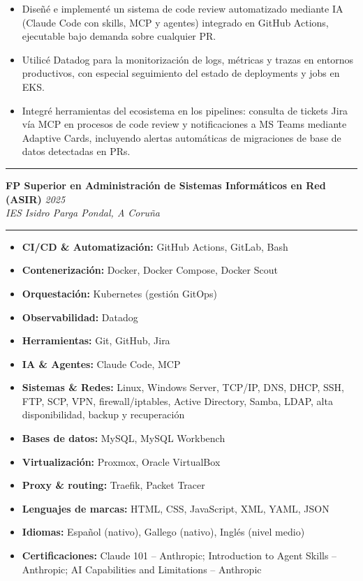 \documentclass[a4paper,11pt]{article}
\newcommand{\cvsection}[1]{%
  \vspace{10pt}%
  \noindent{\large\bfseries\MakeUppercase{#1}}%
  \vspace{2pt}\par\noindent\rule{\linewidth}{0.4pt}%
  \vspace{6pt}%
}
\begin{document}
\begin{itemize}
  \item Diseñé e implementé un sistema de code review automatizado mediante IA (Claude Code con skills, MCP y agentes) integrado en GitHub Actions, ejecutable bajo demanda sobre cualquier PR.
  \item Utilicé Datadog para la monitorización de logs, métricas y trazas en entornos productivos, con especial seguimiento del estado de deployments y jobs en EKS.
  \item Integré herramientas del ecosistema en los pipelines: consulta de tickets Jira vía MCP en procesos de code review y notificaciones a MS Teams mediante Adaptive Cards, incluyendo alertas automáticas de migraciones de base de datos detectadas en PRs.
\end{itemize}

\cvsection{Formación}

\textbf{FP Superior en Administración de Sistemas Informáticos en Red (ASIR)} \hfill \textit{2025} \\
\textit{IES Isidro Parga Pondal, A Coruña}

\cvsection{Habilidades}

\begin{itemize}
  \item \textbf{CI/CD \& Automatización:} GitHub Actions, GitLab, Bash
  \item \textbf{Contenerización:} Docker, Docker Compose, Docker Scout
  \item \textbf{Orquestación:} Kubernetes (gestión GitOps)
  \item \textbf{Observabilidad:} Datadog
  \item \textbf{Herramientas:} Git, GitHub, Jira
  \item \textbf{IA \& Agentes:} Claude Code, MCP
  \item \textbf{Sistemas \& Redes:} Linux, Windows Server, TCP/IP, DNS, DHCP, SSH, FTP, SCP, VPN, firewall/iptables, Active Directory, Samba, LDAP, alta disponibilidad, backup y recuperación
  \item \textbf{Bases de datos:} MySQL, MySQL Workbench
  \item \textbf{Virtualización:} Proxmox, Oracle VirtualBox
  \item \textbf{Proxy \& routing:} Traefik, Packet Tracer
  \item \textbf{Lenguajes de marcas:} HTML, CSS, JavaScript, XML, YAML, JSON
  \item \textbf{Idiomas:} Español (nativo), Gallego (nativo), Inglés (nivel medio)
  \item \textbf{Certificaciones:} Claude 101 -- Anthropic; Introduction to Agent Skills -- Anthropic; AI Capabilities and Limitations -- Anthropic
\end{itemize}
\end{document}
